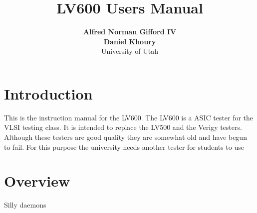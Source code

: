 \documentclass[letterpaper, 10 pt]{report}
\begin{document}
\title{LV600 Users Manual}
\author{\textbf{Alfred Norman Gifford IV} \\ \textbf{Daniel Khoury} \\ University of Utah}
\maketitle
\pagestyle{empty}

\tableofcontents
\newpage

\section{Introduction}
This is the instruction manual for the LV600. The LV600 is a ASIC tester for the VLSI testing class. It is intended to replace the LV500 and the Verigy testers. Although these testers are good quality they are somewhat old and have begun to fail. For this purpose the university needs another tester for students to use
\newpage

\section{Overview}
Silly daemons
\newpage
%

\end{document}
